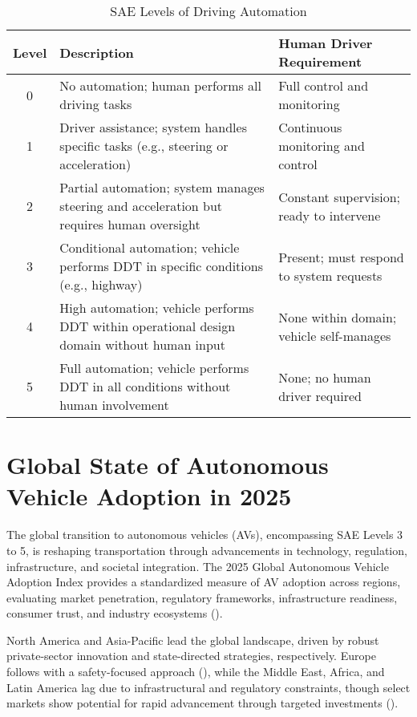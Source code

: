 \begin{table}[h]
\centering
\caption{SAE Levels of Driving Automation}
\begin{tabular}{|c|p{6cm}|p{6cm}|}
\hline
\textbf{Level} & \textbf{Description} & \textbf{Human Driver Requirement} \\
\hline
0 & No automation; human performs all driving tasks & Full control and monitoring \\
\hline
1 & Driver assistance; system handles specific tasks (e.g., steering or acceleration) & Continuous monitoring and control \\
\hline
2 & Partial automation; system manages steering and acceleration but requires human oversight & Constant supervision; ready to intervene \\
\hline
3 & Conditional automation; vehicle performs DDT in specific conditions (e.g., highway) & Present; must respond to system requests \\
\hline
4 & High automation; vehicle performs DDT within operational design domain without human input & None within domain; vehicle self-manages \\
\hline
5 & Full automation; vehicle performs DDT in all conditions without human involvement & None; no human driver required \\
\hline
\end{tabular}
\end{table}

\section{Global State of Autonomous Vehicle Adoption in 2025}

The global transition to autonomous vehicles (AVs), encompassing SAE Levels 3 to 5, is reshaping transportation through advancements in technology, regulation, infrastructure, and societal integration. The 2025 Global Autonomous Vehicle Adoption Index provides a standardized measure of AV adoption across regions, evaluating market penetration, regulatory frameworks, infrastructure readiness, consumer trust, and industry ecosystems (\cite{KPMG2018}).

North America and Asia-Pacific lead the global landscape, driven by robust private-sector innovation and state-directed strategies, respectively. Europe follows with a safety-focused approach (\cite{GOVUK2024}), while the Middle East, Africa, and Latin America lag due to infrastructural and regulatory constraints, though select markets show potential for rapid advancement through targeted investments (\cite{DubaiLaw2023}).

